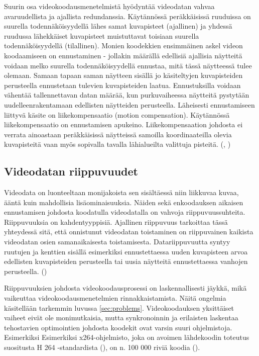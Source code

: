 Suurin osa videokoodausmenetelmistä hyödyntää videodatan vahvaa
avaruudellista ja ajallista redundanssia. Käytännössä peräkkäisissä
ruuduissa on suurella todennäköisyydellä lähes samat kuvapisteet (ajallinen) ja
yhdessä ruudussa lähekkäiset kuvapisteet muistuttavat toisiaan suurella
todennäköisyydellä (tilallinen). Monien koodekkien ensimmäinen askel videon koodaamiseen
on ennustaminen - jollakin määrällä edellisiä ajallisia näytteitä voidaan
melko suurella todennäköisyydellä ennustaa, mitä tässä näytteessä tulee
olemaan. Samaan tapaan saman näytteen sisällä jo käsiteltyjen kuvapisteiden
perusteella ennustetaan tulevien kuvapisteiden laatua. Ennustuksilla voidaan
vähentää tallennettavan datan määrää, kun purkuvaiheessa näytteitä pystytään
uudelleenrakentamaan edellisten näytteiden perusteella. Läheisesti
ennustamiseen liittyvä käsite on liikekompensaatio (motion compensation).
Käytännössä liikekompensaatio on ennustamisen apukeino. Liikekompensaation
johdosta ei verrata
ainoastaan peräkkäisissä näytteissä samoilla koordinaateilla
olevia kuvapisteitä vaan myös sopivalla tavalla lähialueilta valittuja
pisteitä. (\citealt{h264}, \citealt{du})

\subsection{Videodatan riippuvuudet}
\label{sec:depend}

Videodata on luonteeltaan monijakoista sen sisältäessä niin liikkuvaa kuvaa,
ääntä kuin mahdollisia lisäominaisuuksia. Näiden sekä
enkoodauksen aikaisen ennustamisen johdosta koodatulla videodatalla on vahvoja
riippuvuussuhteita. Riippuvuuksia on kahdentyyppisiä. Ajallinen riippuvuus
tarkoittaa tässä yhteydessä sitä, että onnistunut videodatan
toistaminen on riippuvainen kaikista videodatan osien samanaikaisesta
toistamisesta. Datariippuvuutta syntyy ruutujen ja kenttien
sisällä esimerkiksi ennustettaessa uuden kuvapisteen arvoa edellisten
kuvapisteiden perusteella tai uusia näytteitä ennustettaessa  vanhojen
perusteella. (\citealt{mujal})

Riippuvuuksien johdosta videokoodausprosessi on laskennallisesti jäykkä, mikä
vaikeuttaa videokoodausmenetelmien rinnakkaistamista. Näitä ongelmia
käsitellään tarkemmin luvussa \ref{sec:problems}. Videokoodauksen yksittäiset
vaiheet eivät ole monimutkaisia, mutta synkronoinnin ja erilaisten laskentaa
tehostavien optimointien johdosta koodekit ovat varsin suuri ohjelmistoja. Esimerkiksi
Esimerkiksi x264-ohjelmisto, joka on avoimen lähdekoodin toteutus
suositusta H 264 -standardista (\citealt{h264}), on n. 100 000 riviä koodia (\citealt{x264}).

